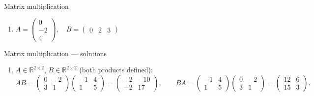 \documentclass[9pt]{beamer}
\begin{document}
\begin{frame}{Matrix multiplication}
\begin{enumerate}[leftmargin = 0.5cm, label = (\alph*), rightmargin = 0.2cm]
            \item 
            $
            A = 
            \begin{pmatrix}
            0  \\
            -2 \\
            4
            \end{pmatrix},\quad 
            B = 
            \begin{pmatrix}
            0 & 2 & 3
            \end{pmatrix}
            $
            
        \end{enumerate}
    
\end{frame}

\begin{frame}{Matrix multiplication — solutions}
\footnotesize

\begin{enumerate}[leftmargin=0.5cm, label=(\alph*), rightmargin=0.2cm]

\item $A\in\mathbb{R}^{2\times 2}$, $B\in\mathbb{R}^{2\times 2}$ (both products defined):
\[
AB=
\begin{pmatrix}
0&-2\\[2pt]3&1
\end{pmatrix}
\!\!
\begin{pmatrix}
-1&4\\[2pt]1&5
\end{pmatrix}
=
\begin{pmatrix}
-2&-10\\[2pt]-2&17
\end{pmatrix},\qquad
BA=
\begin{pmatrix}
-1&4\\[2pt]1&5
\end{pmatrix}
\!\!
\begin{pmatrix}
0&-2\\[2pt]3&1
\end{pmatrix}
=
\begin{pmatrix}
12&6\\[2pt]15&3
\end{pmatrix}.
\]
\medskip


\end{enumerate}
\end{frame}
\end{document}
